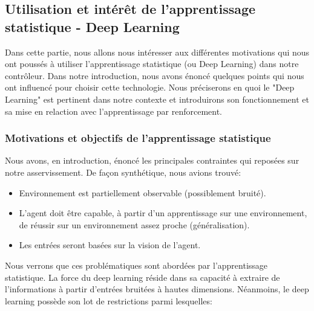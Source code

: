 \subsection{Utilisation et intérêt de l'apprentissage statistique - Deep Learning }

Dans cette partie, nous allons nous intéresser aux différentes motivations qui nous ont poussés à utiliser l'apprentissage statistique (ou Deep Learning) dans notre contrôleur. Dans notre introduction, nous avons énoncé quelques points qui nous ont influencé pour choisir cette technologie. Nous préciserons en quoi le "Deep Learning" est pertinent dans notre contexte et introduirons son fonctionnement et sa mise en relaction avec l'apprentissage par renforcement.

\subsubsection{Motivations et objectifs de l'apprentissage statistique}

Nous avons, en introduction, énoncé les principales contraintes qui reposées sur notre asservissement. De façon synthétique, nous avions trouvé:
\begin{itemize}
    \item Environnement est partiellement observable (possiblement bruité).
    \item L'agent doit être capable, à partir d'un apprentissage sur une environnement,  de réussir sur un environnement assez proche (généralisation).
    \item Les entrées seront basées sur la vision de l'agent.
\end{itemize}

Nous verrons que ces problématiques sont abordées par l'apprentissage statistique. La force du deep learning réside dans sa capacité à extraire de l'informations à partir d'entrées bruitées à hautes dimensions. Néanmoins, le deep learning possède son lot de restrictions parmi lesquelles: 

